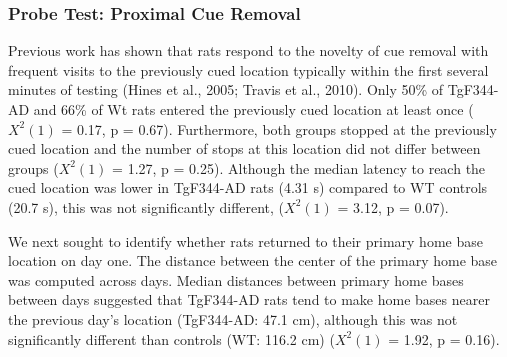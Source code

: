 \documentclass[fleqn,10pt]{wlscirep}
\begin{document}
\subsubsection*{Probe Test: Proximal Cue Removal}
Previous work has shown that rats respond to the novelty of cue removal with frequent visits to the previously cued location typically within the first several minutes of testing \cite{hines_home_2005}(Hines et al., 2005; Travis et al., 2010). Only 50\% of TgF344-AD and 66\% of Wt rats entered the previously cued location at least once ($X^2(1)$ = 0.17, p = 0.67). Furthermore, both groups stopped at the previously cued location and the number of stops at this location did not differ between groups ($X^2(1)$ = 1.27, p = 0.25). Although the median latency to reach the cued location was lower in TgF344-AD rats (4.31 s) compared to WT controls (20.7 s), this was not significantly different, ($X^2(1)$ = 3.12, p = 0.07). 
 
We next sought to identify whether rats returned to their primary home base location on day one. The distance between the center of the primary home base was computed across days. Median distances between primary home bases between days suggested that TgF344-AD rats tend to make home bases nearer the previous day’s location (TgF344-AD: 47.1 cm), although this was not significantly different than controls (WT: 116.2 cm) ($X^2(1)$ = 1.92, p = 0.16).  



\end{document}
